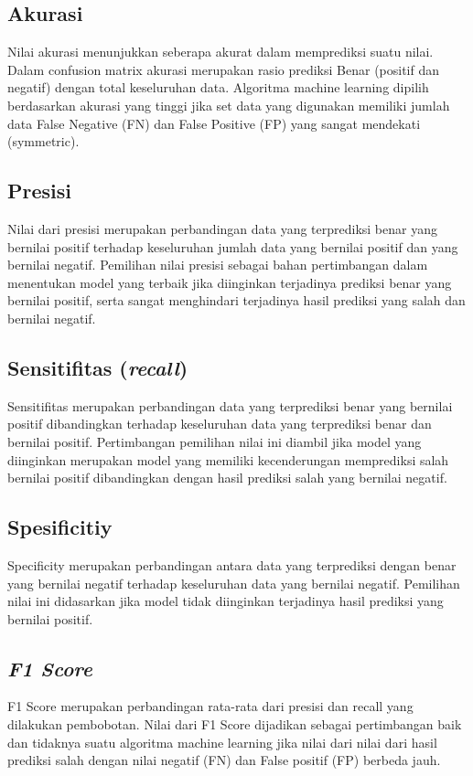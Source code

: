 \subsection{Akurasi}
Nilai akurasi menunjukkan seberapa akurat dalam memprediksi suatu nilai. Dalam 
confusion matrix akurasi merupakan rasio prediksi Benar (positif dan negatif) 
dengan total keseluruhan data. Algoritma machine learning dipilih berdasarkan 
akurasi yang tinggi jika set data yang digunakan memiliki jumlah data False 
Negative (FN) dan False Positive (FP) yang sangat mendekati (symmetric).

\subsection{Presisi}
Nilai dari presisi merupakan perbandingan data yang terprediksi benar yang 
bernilai positif terhadap keseluruhan jumlah data yang bernilai positif dan 
yang bernilai negatif. Pemilihan nilai presisi sebagai bahan pertimbangan 
dalam 
menentukan model yang terbaik jika diinginkan terjadinya prediksi benar yang 
bernilai positif, serta sangat menghindari terjadinya hasil prediksi yang 
salah 
dan bernilai negatif. 

\subsection{Sensitifitas (\textit{recall})}
Sensitifitas merupakan perbandingan data yang terprediksi benar yang bernilai 
positif dibandingkan terhadap keseluruhan data yang terprediksi benar dan 
bernilai positif. Pertimbangan pemilihan nilai ini diambil jika model yang 
diinginkan merupakan model yang memiliki kecenderungan memprediksi salah 
bernilai positif dibandingkan dengan hasil prediksi salah yang bernilai 
negatif.

\subsection{Spesificitiy}
Specificity merupakan perbandingan antara data yang terprediksi dengan benar 
yang bernilai negatif terhadap keseluruhan data yang bernilai negatif. 
Pemilihan nilai ini didasarkan jika model tidak diinginkan terjadinya hasil 
prediksi yang bernilai positif.

\subsection{\textit{F1 Score}}
F1 Score merupakan perbandingan rata-rata dari presisi dan recall yang dilakukan pembobotan. Nilai dari F1 Score dijadikan sebagai pertimbangan baik dan tidaknya suatu algoritma machine learning jika nilai dari nilai dari hasil prediksi salah dengan nilai negatif (FN) dan False positif (FP) berbeda jauh.

